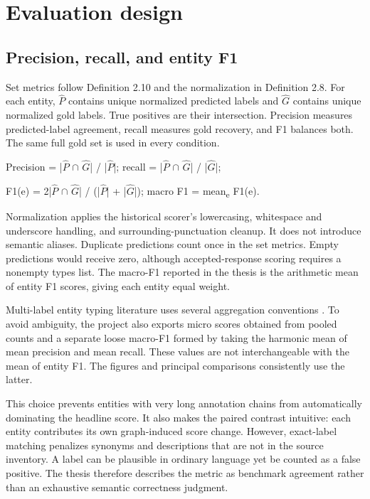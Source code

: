 \chapter{Evaluation design}

\FloatBarrier

\section{Precision, recall, and entity F1}

Set metrics follow Definition 2.10 and the normalization in Definition 2.8. For each entity, \ensuremath{\hat{P}} contains unique normalized predicted labels and \ensuremath{\hat{G}} contains unique normalized gold labels. True positives are their intersection. Precision measures predicted-label agreement, recall measures gold recovery, and F1 balances both. The same full gold set is used in every condition.


Precision = |\ensuremath{\hat{P}} \ensuremath{\cap} \ensuremath{\hat{G}}| / |\ensuremath{\hat{P}}|; recall = |\ensuremath{\hat{P}} \ensuremath{\cap} \ensuremath{\hat{G}}| / |\ensuremath{\hat{G}}|;\par F1(e) = 2|\ensuremath{\hat{P}} \ensuremath{\cap} \ensuremath{\hat{G}}| / (|\ensuremath{\hat{P}}| + |\ensuremath{\hat{G}}|); macro F1 = mean\textsubscript{e} F1(e).


Normalization applies the historical scorer’s lowercasing, whitespace and underscore handling, and surrounding-punctuation cleanup. It does not introduce semantic aliases. Duplicate predictions count once in the set metrics. Empty predictions would receive zero, although accepted-response scoring requires a nonempty types list. The macro-F1 reported in the thesis is the arithmetic mean of entity F1 scores, giving each entity equal weight.


Multi-label entity typing literature uses several aggregation conventions \citep{choi2018}. To avoid ambiguity, the project also exports micro scores obtained from pooled counts and a separate loose macro-F1 formed by taking the harmonic mean of mean precision and mean recall. These values are not interchangeable with the mean of entity F1. The figures and principal comparisons consistently use the latter.


This choice prevents entities with very long annotation chains from automatically dominating the headline score. It also makes the paired contrast intuitive: each entity contributes its own graph-induced score change. However, exact-label matching penalizes synonyms and descriptions that are not in the source inventory. A label can be plausible in ordinary language yet be counted as a false positive. The thesis therefore describes the metric as benchmark agreement rather than an exhaustive semantic correctness judgment.


